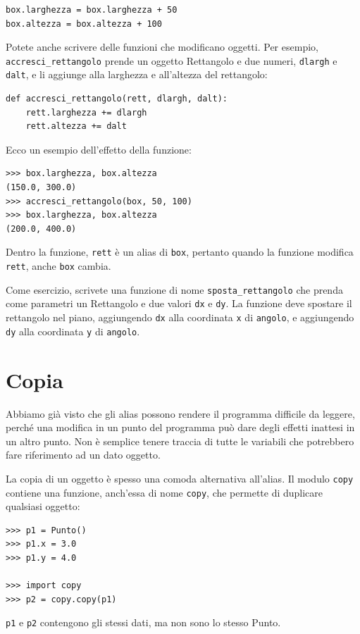 \documentclass[10pt]{book}
\begin{document}
\begin{verbatim}
box.larghezza = box.larghezza + 50
box.altezza = box.altezza + 100
\end{verbatim}
%
Potete anche scrivere delle funzioni che modificano oggetti. Per esempio,
\verb"accresci_rettangolo" prende un oggetto Rettangolo e due numeri,
{\tt dlargh} e {\tt dalt}, e li aggiunge alla larghezza e all'altezza del rettangolo:

\begin{verbatim}
def accresci_rettangolo(rett, dlargh, dalt):
    rett.larghezza += dlargh
    rett.altezza += dalt
\end{verbatim}
%
Ecco un esempio dell'effetto della funzione:

\begin{verbatim}
>>> box.larghezza, box.altezza
(150.0, 300.0)
>>> accresci_rettangolo(box, 50, 100)
>>> box.larghezza, box.altezza
(200.0, 400.0)
\end{verbatim}
%
Dentro la funzione, {\tt rett} è un alias di {\tt box}, pertanto quando la funzione modifica {\tt rett}, anche {\tt box} cambia.

Come esercizio, scrivete una funzione di nome \verb"sposta_rettangolo" che prenda come parametri un Rettangolo e due valori {\tt dx} e {\tt dy}.  La funzione deve spostare il rettangolo nel piano, aggiungendo {\tt dx} alla coordinata {\tt x} di {\tt angolo}, e aggiungendo {\tt dy} alla coordinata {\tt y} di {\tt angolo}.



\section{Copia}
\label{copying}

Abbiamo già visto che gli alias possono rendere il programma difficile
   da leggere, perché una modifica in un punto del programma può dare degli effetti inattesi in un altro punto. Non è semplice tenere traccia di tutte le variabili che potrebbero fare riferimento ad un dato oggetto.

La copia di un oggetto è spesso una comoda alternativa all'alias.
Il modulo {\tt copy} contiene una funzione, anch'essa di nome {\tt copy}, che permette di duplicare qualsiasi oggetto:

\begin{verbatim}
>>> p1 = Punto()
>>> p1.x = 3.0
>>> p1.y = 4.0

>>> import copy
>>> p2 = copy.copy(p1)
\end{verbatim}
%
{\tt p1} e {\tt p2} contengono gli stessi dati, ma non sono lo stesso Punto.
\end{document}
